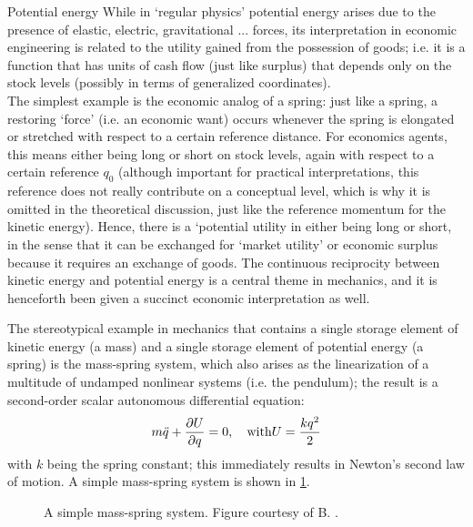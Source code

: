 \begin{econ}{Potential energy}
    While in `regular physics' potential energy arises due to the presence of elastic, electric, gravitational ... forces, its interpretation in economic engineering is related to the utility gained from the possession of goods; i.e. it is a function that has units of cash flow (just like surplus) that depends only on the stock levels (possibly in terms of generalized coordinates).\\

    The simplest example is the economic analog of a spring: just like a spring, a restoring `force' (i.e. an economic want) occurs whenever the spring is elongated or stretched with respect to a certain reference distance. For economics agents, this means either being long or short on stock levels, again with respect to a certain reference $q_0$ (although important for practical interpretations, this reference does not really contribute on a conceptual level, which is why it is omitted in the theoretical discussion, just like the reference momentum for the kinetic energy). Hence, there is a `potential utility in either being long or short, in the sense that it can be exchanged for `market utility' or economic surplus because it requires an exchange of goods. The continuous reciprocity between kinetic energy and 
    potential energy is a central theme in mechanics, and it is henceforth been given a succinct economic interpretation as well.
\end{econ}
The stereotypical example in mechanics that contains a single storage element of kinetic energy (a mass) and a single storage  element of potential energy (a spring) is the mass-spring system, which also arises as the linearization of a multitude of undamped nonlinear systems (i.e. the pendulum); the result is a second-order scalar autonomous differential equation:
\begin{equation}
    m\ddot{q} + \pdv{U}{q} = 0, \quad \text{with} U = \frac{kq^2}{2}
    \label{eq:mass_spring}
\end{equation}
with $k$ being the spring constant; this immediately results in Newton's second law of motion. A simple mass-spring system is shown in \cref{fig:mass_spring}.
\begin{figure}[ht]
    \centering
    
    \caption{A simple mass-spring system. Figure courtesy of B. \citet{Krabbenborg2021}.}
    \label{fig:mass_spring}
\end{figure}

